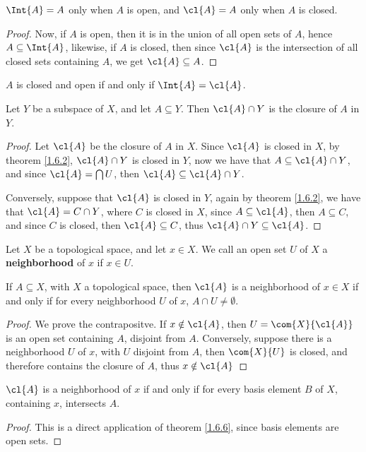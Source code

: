 \begin{lemma}\label{1.6.4}
    $\Int{A}=A$ only when  $A$ is open, and  $\cl{A}=A$ only when  $A$ is
    closed.
\end{lemma}
\begin{proof}
    Now, if $A$ is open, then it is in the union of all open sets of  $A$, hence
    $A \subseteq \Int{A}$, likewise, if  $A$ is closed, then since $\cl{A}$ is
    the intersection of all closed sets containing  $A$, we get $\cl{A}
    \subseteq A$.
\end{proof}
\begin{corollary}
    $A$ is closed and open if and only if  $\Int{A}=\cl{A}$.
\end{corollary}

\begin{theorem}\label{1.6.5}
    Let $Y$ be a subspace of  $X$, and let  $A \subseteq Y$. Then  $\cl{A}
    \cap Y$ is the closure of  $A$ in $Y$.
\end{theorem}
\begin{proof}
    Let $\cl{A}$ be the closure of  $A$ in  $X$. Since  $\cl{A}$ is closed in
    $X$, by theorem \ref{1.6.2},  $\cl{A} \cap Y$ is closed in  $Y$, now we
    have that $A \subseteq \cl{A} \cap Y$, and since $\cl{A}=\bigcap{U}$, then
    $\cl{A} \subseteq \cl{A} \cap Y$.

    Conversely, suppose that $\cl{A}$ is closed in  $Y$, again by theorem
    \ref{1.6.2}, we have that  $\cl{A}=C \cap Y$, where  $C$ is closed in  $X$,
    since  $A \subseteq \cl{A}$, then  $A \subseteq C$, and since  $C$ is
    closed, then  $\cl{A} \subseteq C$, thus  $\cl{A} \cap Y \subseteq
    \cl{A}$.
\end{proof}

\begin{definition}
    Let $X$ be a topological space, and let  $x \in X$. We call an open set  $U$
    of  $X$ a \textbf{neighborhood} of  $x$ if  $x \in U$.
\end{definition}

\begin{theorem}\label{1.6.6}
    If $A \subseteq X$, with  $X$ a topological space, then  $\cl{A}$ is a
    neighborhood of  $x \in X$ if and only if for every neighborhood  $U$ of
    $x$,  $A \cap U \neq \emptyset$.
\end{theorem}
\begin{proof}
    We prove the contrapositve. If $x \notin \cl{A}$, then
    $U=\com{X}{\cl{A}}$ is an open set containing  $A$, disjoint from
    $A$. Conversely, suppose there is a neighborhood $U$ of $x$, with $U$
    disjoint from  $A$, then  $\com{X}{U}$ is closed, and therefore contains the
    closure of  $A$, thus  $x \notin \cl{A}$
\end{proof}
\begin{corollary}
    $\cl{A}$ is a neighborhood of  $x$ if and only if for every basis element
    $B$ of  $X$, containing  $x$, intersects  $A$.
\end{corollary}
\begin{proof}
    This is a direct application of theorem \ref{1.6.6}, since basis elements
    are open sets.
\end{proof}

